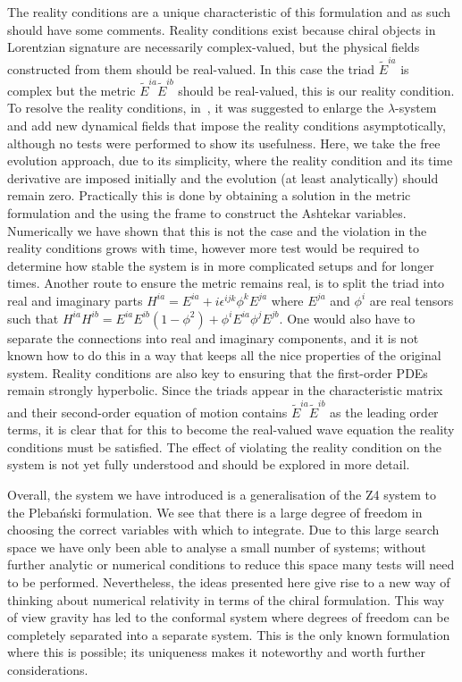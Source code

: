 \documentclass[10pt]{report}
\newcommand{\pleb}[0]{Pleba\'nski}
\theoremstyle{definition}
\newcommand{\tE}[0]{\tilde{E}}
\begin{document}
    The reality conditions are a unique characteristic of this formulation and as such should have some comments. Reality conditions exist because chiral objects in Lorentzian signature are necessarily complex-valued, but the physical fields constructed from them should be real-valued. In this case the triad $\tE^{ia}$ is complex but the metric $\tE^{ia} \tE^{ib}$ should be real-valued, this is our reality condition. To resolve the reality conditions, in~\cite{Asymptotically_Shinka_1999}, it was suggested to enlarge the $\lambda$-system and add new dynamical fields that impose the reality conditions asymptotically, although no tests were performed to show its usefulness. Here, we take the free evolution approach, due to its simplicity, where the reality condition and its time derivative are imposed initially and the evolution (at least analytically) should remain zero. Practically this is done by obtaining a solution in the metric formulation and the using the frame to construct the Ashtekar variables. Numerically we have shown that this is not the case and the violation in the reality conditions grows with time, however more test would be required to determine how stable the system is in more complicated setups and for longer times. Another route to ensure the metric remains real, is to split the triad into real and imaginary parts $H^{ia} = E^{ia} + i \epsilon^{ijk} \phi^k E^{ja}$ where $E^{ja}$ and $\phi^i$ are real tensors such that $H^{ia} H^{ib} = E^{ia}E^{ib} (1-\phi^2) + \phi^{i}E^{ia} \phi^{j} E^{jb}$. One would also have to separate the connections into real and imaginary components, and it is not known how to do this in a way that keeps all the nice properties of the original system. Reality conditions are also key to ensuring that the first-order PDEs remain strongly hyperbolic. Since the triads appear in the characteristic matrix and their second-order equation of motion contains $\tE^{ia} \tE^{ib}$ as the leading order terms, it is clear that for this to become the real-valued wave equation the reality conditions must be satisfied. The effect of violating the reality condition on the system is not yet fully understood and should be explored in more detail.

    Overall, the system we have introduced is a generalisation of the Z4 system to the \pleb{} formulation. We see that there is a large degree of freedom in choosing the correct variables with which to integrate. Due to this large search space we have only been able to analyse a small number of systems; without further analytic or numerical conditions to reduce this space many tests will need to be performed. Nevertheless, the ideas presented here give rise to a new way of thinking about numerical relativity in terms of the chiral formulation. This way of view gravity has led to the conformal system where degrees of freedom can be completely separated into a separate system. This is the only known formulation where this is possible; its uniqueness makes it noteworthy and worth further considerations.
\end{document}
